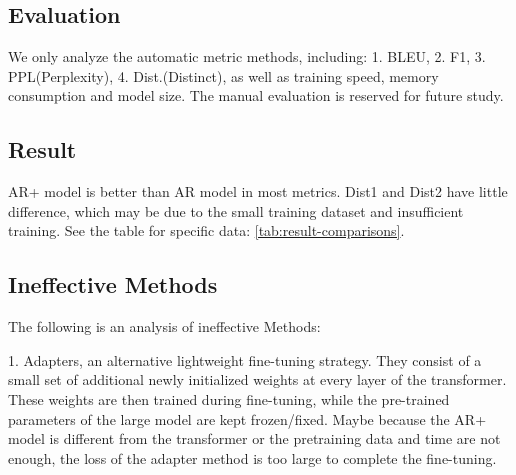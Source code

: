 \documentclass[letterpaper]{article} %
\DeclareRobustCommand{\citeext}[1]{\cite[#1]{#1}}
\begin{document}
\subsection[Evaluation]{Evaluation} 
We only analyze the automatic metric methods, including: 1. BLEU\citeext{Papineni2002}, 2. F1, 3. PPL(Perplexity), 4. Dist.(Distinct)\citeext{Li2016}, as well as training speed, memory consumption and model size. The manual evaluation is reserved for future study. 

\subsection[Result]{Result} 
AR+ model is better than AR model in most metrics. Dist1 and Dist2 have little difference, which may be due to the small training dataset and insufficient training. See the table for specific data: \ref{tab:result-comparisons}.


\begin{table*} [b]
\centering
\caption{Experimental results, bold data is improved metric}
\label{tab:result-comparisons}
\end{table*}


\subsection[Ineffective Methods]{Ineffective Methods} 
The following is an analysis of ineffective Methods: 

1. Adapters\citeext{Houlsby2019}, an alternative lightweight fine-tuning strategy. They consist of a small set of additional newly initialized weights at every layer of the transformer. These weights are then trained during fine-tuning, while the pre-trained parameters of the large model are kept frozen/fixed. Maybe because the AR+ model is different from the transformer or the pretraining data and time are not enough, the loss of the adapter method is too large to complete the fine-tuning. 
\end{document}
